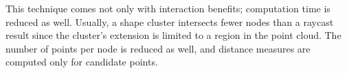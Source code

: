 This technique comes not only with interaction benefits; computation time is reduced as well. Usually, a shape cluster intersects fewer nodes than a raycast result since the cluster's extension is limited to a region in the point cloud. The number of points per node is reduced as well, and distance measures are computed only for candidate points. 
\\
\begin{figure}
\centering
{}\par\medskip
{}\par\medskip        
{}
\end{figure}
